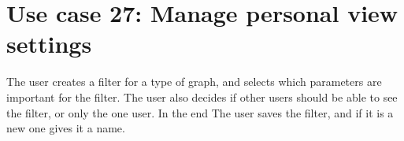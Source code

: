 \section{Use case 27: Manage personal view settings}
\label{app:usecase:viewsettings}
The user creates a filter for a type of graph, and selects which parameters are
important for the filter. The user also decides if other users should be able to
see the filter, or only the one user. In the end The user saves the filter, and
if it is a new one gives it a name.
